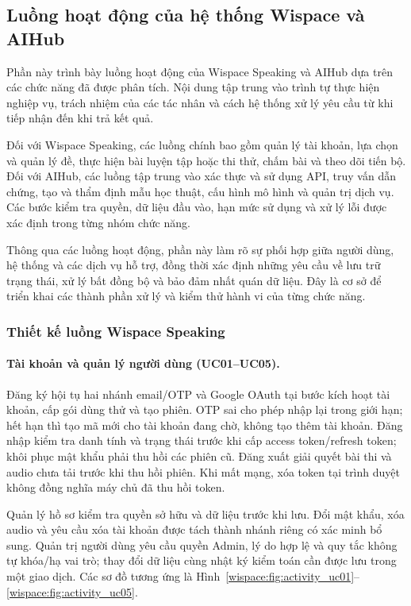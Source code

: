 \subsection{Luồng hoạt động của hệ thống Wispace và AIHub}
\label{sec:activity-design-wispace-aihub}

Phần này trình bày luồng hoạt động của Wispace Speaking và AIHub dựa trên các chức năng đã được phân tích. Nội dung tập trung vào trình tự thực hiện nghiệp vụ, trách nhiệm của các tác nhân và cách hệ thống xử lý yêu cầu từ khi tiếp nhận đến khi trả kết quả.

Đối với Wispace Speaking, các luồng chính bao gồm quản lý tài khoản, lựa chọn và quản lý đề, thực hiện bài luyện tập hoặc thi thử, chấm bài và theo dõi tiến bộ. Đối với AIHub, các luồng tập trung vào xác thực và sử dụng API, truy vấn dẫn chứng, tạo và thẩm định mẫu học thuật, cấu hình mô hình và quản trị dịch vụ. Các bước kiểm tra quyền, dữ liệu đầu vào, hạn mức sử dụng và xử lý lỗi được xác định trong từng nhóm chức năng.

Thông qua các luồng hoạt động, phần này làm rõ sự phối hợp giữa người dùng, hệ thống và các dịch vụ hỗ trợ, đồng thời xác định những yêu cầu về lưu trữ trạng thái, xử lý bất đồng bộ và bảo đảm nhất quán dữ liệu. Đây là cơ sở để triển khai các thành phần xử lý và kiểm thử hành vi của từng chức năng.

\subsubsection{Thiết kế luồng Wispace Speaking}

\paragraph{Tài khoản và quản lý người dùng (UC01--UC05).}
Đăng ký hội tụ hai nhánh email/OTP và Google OAuth tại bước kích hoạt tài khoản, cấp gói dùng thử và tạo phiên. OTP sai cho phép nhập lại trong giới hạn; hết hạn thì tạo mã mới cho tài khoản đang chờ, không tạo thêm tài khoản. Đăng nhập kiểm tra danh tính và trạng thái trước khi cấp access token/refresh token; khôi phục mật khẩu phải thu hồi các phiên cũ. Đăng xuất giải quyết bài thi và audio chưa tải trước khi thu hồi phiên. Khi mất mạng, xóa token tại trình duyệt không đồng nghĩa máy chủ đã thu hồi token.

Quản lý hồ sơ kiểm tra quyền sở hữu và dữ liệu trước khi lưu. Đổi mật khẩu, xóa audio và yêu cầu xóa tài khoản được tách thành nhánh riêng có xác minh bổ sung. Quản trị người dùng yêu cầu quyền Admin, lý do hợp lệ và quy tắc không tự khóa/hạ vai trò; thay đổi dữ liệu cùng nhật ký kiểm toán cần được lưu trong một giao dịch. Các sơ đồ tương ứng là Hình~\ref{wispace:fig:activity_uc01}--\ref{wispace:fig:activity_uc05}.


